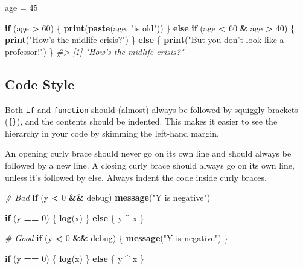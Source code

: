 \documentclass[]{book}
\newenvironment{Shaded}{\begin{snugshade}}{\end{snugshade}}
\newcommand{\CommentTok}[1]{\textcolor[rgb]{0.56,0.35,0.01}{\textit{#1}}}
\newcommand{\ControlFlowTok}[1]{\textcolor[rgb]{0.13,0.29,0.53}{\textbf{#1}}}
\newcommand{\DecValTok}[1]{\textcolor[rgb]{0.00,0.00,0.81}{#1}}
\newcommand{\KeywordTok}[1]{\textcolor[rgb]{0.13,0.29,0.53}{\textbf{#1}}}
\newcommand{\NormalTok}[1]{#1}
\newcommand{\OperatorTok}[1]{\textcolor[rgb]{0.81,0.36,0.00}{\textbf{#1}}}
\newcommand{\StringTok}[1]{\textcolor[rgb]{0.31,0.60,0.02}{#1}}
\begin{document}
\begin{Shaded}
\begin{Highlighting}[]
\NormalTok{age =}\StringTok{ }\DecValTok{45} 

\ControlFlowTok{if}\NormalTok{ (age }\OperatorTok{>}\StringTok{ }\DecValTok{60}\NormalTok{) \{}
    \KeywordTok{print}\NormalTok{(}\KeywordTok{paste}\NormalTok{(age, }\StringTok{"is old"}\NormalTok{))}
\NormalTok{\} }\ControlFlowTok{else} \ControlFlowTok{if}\NormalTok{ (age }\OperatorTok{<}\StringTok{ }\DecValTok{60} \OperatorTok{&}\StringTok{ }\NormalTok{age }\OperatorTok{>}\StringTok{ }\DecValTok{40}\NormalTok{) \{}
    \KeywordTok{print}\NormalTok{(}\StringTok{"How's the midlife crisis?"}\NormalTok{)}
\NormalTok{\} }\ControlFlowTok{else}\NormalTok{ \{}
    \KeywordTok{print}\NormalTok{(}\StringTok{"But you don't look like a professor!"}\NormalTok{)}
\NormalTok{\}}
\CommentTok{#> [1] "How's the midlife crisis?"}
\end{Highlighting}
\end{Shaded}

\hypertarget{code-style}{%
\subsection{Code Style}\label{code-style}}

Both \texttt{if} and \texttt{function} should (almost) always be followed by squiggly brackets (\texttt{\{\}}), and the contents should be indented. This makes it easier to see the hierarchy in your code by skimming the left-hand margin.

An opening curly brace should never go on its own line and should always be followed by a new line. A closing curly brace should always go on its own line, unless it's followed by else. Always indent the code inside curly braces.

\begin{Shaded}
\begin{Highlighting}[]
\CommentTok{# Bad}
\ControlFlowTok{if}\NormalTok{ (y }\OperatorTok{<}\StringTok{ }\DecValTok{0} \OperatorTok{&&}\StringTok{ }\NormalTok{debug)}
\KeywordTok{message}\NormalTok{(}\StringTok{"Y is negative"}\NormalTok{)}

\ControlFlowTok{if}\NormalTok{ (y }\OperatorTok{==}\StringTok{ }\DecValTok{0}\NormalTok{) \{}
  \KeywordTok{log}\NormalTok{(x)}
\NormalTok{\} }
\ControlFlowTok{else}\NormalTok{ \{}
\NormalTok{  y }\OperatorTok{^}\StringTok{ }\NormalTok{x}
\NormalTok{\}}

\CommentTok{# Good}
\ControlFlowTok{if}\NormalTok{ (y }\OperatorTok{<}\StringTok{ }\DecValTok{0} \OperatorTok{&&}\StringTok{ }\NormalTok{debug) \{}
  \KeywordTok{message}\NormalTok{(}\StringTok{"Y is negative"}\NormalTok{)}
\NormalTok{\}}

\ControlFlowTok{if}\NormalTok{ (y }\OperatorTok{==}\StringTok{ }\DecValTok{0}\NormalTok{) \{}
  \KeywordTok{log}\NormalTok{(x)}
\NormalTok{\} }\ControlFlowTok{else}\NormalTok{ \{}
\NormalTok{  y }\OperatorTok{^}\StringTok{ }\NormalTok{x}
\NormalTok{\}}
\end{Highlighting}
\end{Shaded}
\end{document}
